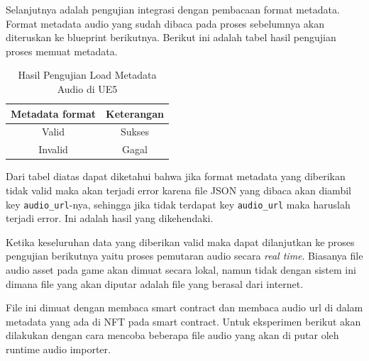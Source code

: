 Selanjutnya adalah pengujian integrasi dengan pembacaan format metadata. Format metadata audio yang sudah dibaca pada proses sebelumnya akan diteruskan ke blueprint berikutnya.
Berikut ini adalah tabel hasil pengujian proses memuat metadata.

\begin{longtable}{|c|c|}
  \caption{Hasil Pengujian Load Metadata Audio di UE5}
  \label{tb:UjiIntegrasiPengujianLoadMetadataAudio} \\
  \hline
  \rowcolor[HTML]{C0C0C0}
  \textbf{Metadata format} & \textbf{Keterangan}    \\
  \hline
  Valid                    & Sukses                 \\
  Invalid                  & Gagal                  \\
  \hline
\end{longtable}

Dari tabel diatas dapat diketahui bahwa jika format metadata yang diberikan tidak valid maka akan terjadi error karena file JSON yang dibaca
akan diambil key \texttt{audio\_url}-nya, sehingga jika tidak terdapat key \texttt{audio\_url} maka haruslah terjadi error. Ini adalah hasil yang dikehendaki.

Ketika keseluruhan data yang diberikan valid maka dapat dilanjutkan ke proses pengujian berikutnya yaitu proses pemutaran audio secara \emph{real time}.
Biasanya file audio asset pada game akan dimuat secara lokal, namun tidak dengan sistem ini dimana file yang akan diputar adalah file yang berasal dari internet.

File ini dimuat dengan membaca smart contract dan membaca audio url di dalam metadata yang ada di NFT pada smart contract. Untuk eksperimen berikut akan dilakukan
dengan cara mencoba beberapa file audio yang akan di putar oleh runtime audio importer.

